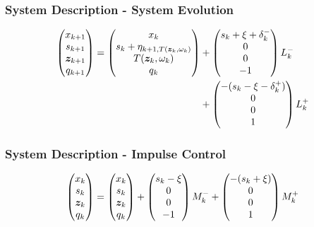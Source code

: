 \begin{frame}
\frametitle{System Description - System Evolution}
\[ 
\begin{aligned}
\begin{pmatrix}
x_{k+1} \\
s_{k+1} \\
\bm{z}_{k+1} \\
q_{k+1} 
\end{pmatrix} = \begin{pmatrix}
x_k \\
s_{k} + \eta_{k+1,T(\bm{z}_k, \omega_k)} \\
T(\bm{z}_k, \omega_k) \\
q_{k}
\end{pmatrix}
& + \begin{pmatrix}
s_k + \xi + \delta_k^- \\
0 \\
0 \\
-1
\end{pmatrix}L_k^- \\
& + \begin{pmatrix}
- (s_k - \xi - \delta_k^+) \\
0 \\
0 \\
1
\end{pmatrix} L_k^+ 
\end{aligned}
\]
\end{frame}

\begin{frame}
\frametitle{System Description - Impulse Control}
\[ \begin{pmatrix}
x_{k} \\
s_{k} \\
\bm{z}_{k} \\
q_{k} 
\end{pmatrix} = \begin{pmatrix}
x_{k} \\
s_{k} \\
\bm{z}_{k} \\
q_{k}
\end{pmatrix}
+ \begin{pmatrix}
s_k - \xi \\
0 \\
0 \\
-1
\end{pmatrix}M_k^-
+ \begin{pmatrix}
- (s_k + \xi) \\
0 \\
0 \\
1
\end{pmatrix} M_k^+ \]
\end{frame}

